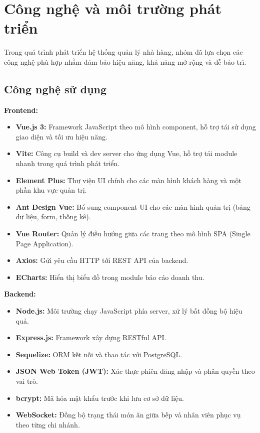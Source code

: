 \documentclass[../DoAn.tex]{subfiles}
\begin{document}
\section{Công nghệ và môi trường phát triển}
\label{section:4.1}

Trong quá trình phát triển hệ thống quản lý nhà hàng, nhóm đã lựa chọn các công nghệ phù hợp nhằm đảm bảo hiệu năng, khả năng mở rộng và dễ bảo trì.

\subsection{Công nghệ sử dụng}

\textbf{Frontend:}
\begin{itemize}
    \item \textbf{Vue.js 3:} Framework JavaScript theo mô hình component, hỗ trợ tái sử dụng giao diện và tối ưu hiệu năng.
    \item \textbf{Vite:} Công cụ build và dev server cho ứng dụng Vue, hỗ trợ tải module nhanh trong quá trình phát triển.
    \item \textbf{Element Plus:} Thư viện UI chính cho các màn hình khách hàng và một phần khu vực quản trị.
    \item \textbf{Ant Design Vue:} Bổ sung component UI cho các màn hình quản trị (bảng dữ liệu, form, thống kê).
    \item \textbf{Vue Router:} Quản lý điều hướng giữa các trang theo mô hình SPA (Single Page Application).
    \item \textbf{Axios:} Gửi yêu cầu HTTP tới REST API của backend.
    \item \textbf{ECharts:} Hiển thị biểu đồ trong module báo cáo doanh thu.
\end{itemize}

\textbf{Backend:}
\begin{itemize}
    \item \textbf{Node.js:} Môi trường chạy JavaScript phía server, xử lý bất đồng bộ hiệu quả.
    \item \textbf{Express.js:} Framework xây dựng RESTful API.
    \item \textbf{Sequelize:} ORM kết nối và thao tác với PostgreSQL.
    \item \textbf{JSON Web Token (JWT):} Xác thực phiên đăng nhập và phân quyền theo vai trò.
    \item \textbf{bcrypt:} Mã hóa mật khẩu trước khi lưu cơ sở dữ liệu.
    \item \textbf{WebSocket:} Đồng bộ trạng thái món ăn giữa bếp và nhân viên phục vụ theo từng chi nhánh.
\end{itemize}
\end{document}
